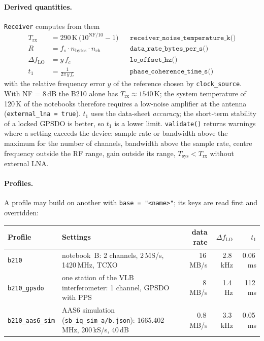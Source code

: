 \paragraph*{Derived quantities.} \texttt{Receiver} computes from them
\begin{align}
  T_\mathrm{rx} &= 290\,\mathrm{K}\,\bigl(10^{\mathrm{NF}/10}-1\bigr)
     && \texttt{receiver\_noise\_temperature\_k()}\\
  R &= f_s \cdot n_\mathrm{bytes} \cdot n_\mathrm{ch}
     && \texttt{data\_rate\_bytes\_per\_s()}\\
  \Delta f_\mathrm{LO} &= y\,f_c
     && \texttt{lo\_offset\_hz()}\\
  t_1 &= \frac{1}{2\pi\,y\,f_c}
     && \texttt{phase\_coherence\_time\_s()}
\end{align}
with the relative frequency error $y$ of the reference chosen by
\texttt{clock\_source}. With NF = 8\,dB the B210 alone has
$T_\mathrm{rx}\approx 1540\,\mathrm{K}$; the system temperature of 120\,K
of the notebooks therefore requires a low-noise amplifier at the antenna
(\texttt{external\_lna = true}). $t_1$ uses the data-sheet
\emph{accuracy}; the short-term stability of a locked GPSDO is better, so
$t_1$ is a lower limit. \texttt{validate()} returns warnings where a setting
exceeds the device: sample rate or bandwidth above the maximum for the
number of channels, bandwidth above the sample rate, centre frequency
outside the RF range, gain outside its range, $T_\mathrm{sys} < T_\mathrm{rx}$
without external LNA.

\paragraph*{Profiles.} A profile may build on another with
\verb|base = "<name>"|; its keys are read first and overridden:
\begin{center}
\begin{tabular}{@{}l>{\raggedright\arraybackslash}p{5.2cm}rrr@{}}
\toprule
Profile & Settings & data rate & $\Delta f_\mathrm{LO}$ & $t_1$ \\
\midrule
\texttt{b210} & notebook~B: 2 channels, 2\,MS/s, 1420\,MHz, TCXO & 16\,MB/s & 2.8\,kHz & 0.06\,ms \\
\texttt{b210\_gpsdo} & one station of the VLB interferometer: 1 channel, GPSDO with PPS & 8\,MB/s & 1.4\,Hz & 112\,ms \\
\texttt{b210\_aas6\_sim} & AAS6 simulation (\texttt{sb\_iq\_sim\_a/b.json}): 1665.402\,MHz, 200\,kS/s, 40\,dB & 0.8\,MB/s & 3.3\,kHz & 0.05\,ms \\
\bottomrule
\end{tabular}
\end{center}

